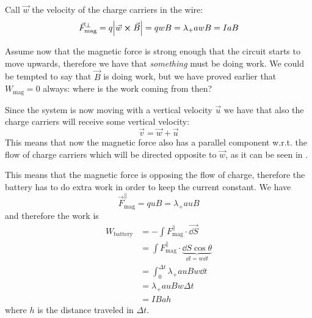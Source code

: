 \documentclass[12pt]{extarticle}
\begin{document}
Call $\vec w$ the velocity of the charge carriers in the wire:
\begin{equation}
    \vec F_\text{mag}^\perp = q \abs{\vec w \cross \vec B} = q w B = \lambda_+ a w B = I a B
\end{equation}

Assume now that the magnetic force is strong enough that the circuit starts to move upwards,
therefore we have that \emph{something} must be doing work.
We could be tempted to say that $\vec B$ is doing work, but we have proved earlier that $W_\text{mag} = 0$ always:
where is the work coming from then?

Since the system is now moving with a vertical velocity $\vec u$ we have that also the charge carriers
will receive some vertical velocity:
\begin{equation}
    \vec v = \vec w + \vec u
\end{equation}
This means that now the magnetic force also has a parallel component w.r.t. the flow of charge carriers
which will be directed opposite to $\vec w$, as it can be seen in .

This means that the magnetic force is opposing the flow of charge, therefore the battery has to do extra work
in order to keep the current constant.
We have
\begin{equation}
    \vec F_\text{mag}^\parallel = q u B = \lambda_+ a u B
\end{equation}
and therefore the work is
\begin{align}
    W_\text{battery} & = - \int F_\text{mag}^\parallel \cdot \vec{\dd S}                                    \\
                     & = \int F_\text{mag}^\parallel \cdot \underbrace{\dd S \cos \theta}_{\dd l = w \dd t} \\
                     & = \int_0^{\Delta t} \lambda_+ a u B w \dd t                                          \\
                     & = \lambda_+ a u B w \Delta t                                                         \\
                     & = I B a h
\end{align}
where $h$ is the distance traveled in $\Delta t$.
\end{document}
